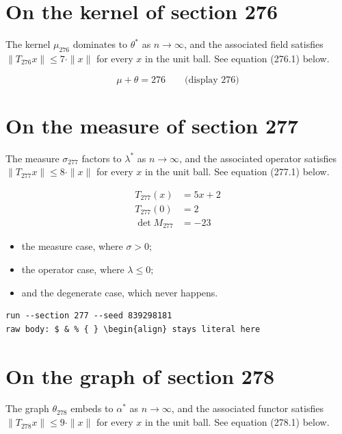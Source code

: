 \documentclass{article}
\begin{document}
\section{On the kernel of section 276}
The kernel $\mu_{276}$ dominates to $\theta^{*}$ as $n \to \infty$,
and the associated field satisfies $\|T_{276} x\| \leq 7 \cdot \|x\|$
for every $x$ in the unit ball. See equation (276.1) below.

$$
\mu + \theta = 276 \qquad \text{(display 276)}
$$

\section{On the measure of section 277}
The measure $\sigma_{277}$ factors to $\lambda^{*}$ as $n \to \infty$,
and the associated operator satisfies $\|T_{277} x\| \leq 8 \cdot \|x\|$
for every $x$ in the unit ball. See equation (277.1) below.

\begin{align}
T_{277}(x) &= 5 x + 2 \\
T_{277}(0) &= 2 \\
\det M_{277} &= -23
\end{align}

\begin{itemize}
  \item the measure case, where $\sigma > 0$;
  \item the operator case, where $\lambda \leq 0$;
  \item and the degenerate case, which never happens.
\end{itemize}

\begin{verbatim}
run --section 277 --seed 839298181
raw body: $ & % { } \begin{align} stays literal here
\end{verbatim}

\section{On the graph of section 278}
The graph $\theta_{278}$ embeds to $\alpha^{*}$ as $n \to \infty$,
and the associated functor satisfies $\|T_{278} x\| \leq 9 \cdot \|x\|$
for every $x$ in the unit ball. See equation (278.1) below.
\end{document}
